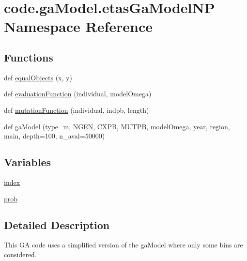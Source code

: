 \hypertarget{namespacecode_1_1ga_model_1_1etas_ga_model_n_p}{}\section{code.\+ga\+Model.\+etas\+Ga\+Model\+NP Namespace Reference}
\label{namespacecode_1_1ga_model_1_1etas_ga_model_n_p}
\subsection*{Functions}
\begin{DoxyCompactItemize}
\item 
def \hyperlink{namespacecode_1_1ga_model_1_1etas_ga_model_n_p_a55347c3a6b9ba79bbafaea3eb0e01d02}{equal\+Objects} (x, y)
\item 
def \hyperlink{namespacecode_1_1ga_model_1_1etas_ga_model_n_p_ac4293bc9b34c59edb160dd415aab67d4}{evaluation\+Function} (individual, model\+Omega)
\item 
def \hyperlink{namespacecode_1_1ga_model_1_1etas_ga_model_n_p_a42e39f20622d00169bd4349e4c047585}{mutation\+Function} (individual, indpb, length)
\item 
def \hyperlink{namespacecode_1_1ga_model_1_1etas_ga_model_n_p_a1198db0e4034344a65eee6f236b13628}{ga\+Model} (type\+\_\+m, N\+G\+EN, C\+X\+PB, M\+U\+T\+PB, model\+Omega, year, region, main, depth=100, n\+\_\+aval=50000)
\end{DoxyCompactItemize}
\subsection*{Variables}
\begin{DoxyCompactItemize}
\item 
\hyperlink{namespacecode_1_1ga_model_1_1etas_ga_model_n_p_a225f0565f9551cdcb54367b68b43f0a9}{index}
\item 
\hyperlink{namespacecode_1_1ga_model_1_1etas_ga_model_n_p_ab1c9e9d1bd611153aa796cef8982c6f6}{prob}
\end{DoxyCompactItemize}


\subsection{Detailed Description}
\begin{DoxyVerb}This GA code uses a simplified version of the gaModel where only some bins are considered.\end{DoxyVerb}
 

